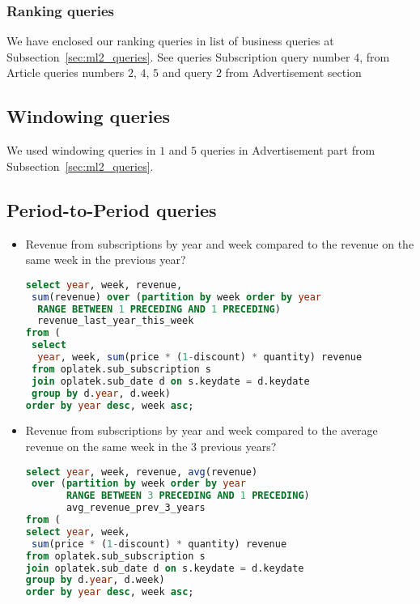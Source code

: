 \subsubsection{Ranking queries} %
\label{sub:ranking}
We have enclosed our ranking queries in list of business queries at Subsection~\ref{sec:ml2_queries}.
See queries Subscription query number $4$, from Article queries numbers $2$, $4$, $5$
and query $2$ from Advertisement section

\subsection{Windowing queries} 
\label{sub:windowing}
We used windowing queries in $1$ and $5$ queries in Advertisement part from Subsection~\ref{sec:ml2_queries}.

\subsection{Period-to-Period queries} %
\label{sub:period2period}
\begin{itemize}
    \item Revenue from subscriptions by year and week compared to the revenue on the same week in the previous year?
\begin{lstlisting}[language=sql] 
select year, week, revenue, 
 sum(revenue) over (partition by week order by year 
  RANGE BETWEEN 1 PRECEDING AND 1 PRECEDING) 
  revenue_last_year_this_week        
from (
 select 
  year, week, sum(price * (1-discount) * quantity) revenue 
 from oplatek.sub_subscription s 
 join oplatek.sub_date d on s.keydate = d.keydate 
 group by d.year, d.week)
order by year desc, week asc;
\end{lstlisting}

\item Revenue from subscriptions by year and week compared to the average revenue on the same week in the 3 previous years?
\begin{lstlisting}[language=sql] 
select year, week, revenue, avg(revenue) 
 over (partition by week order by year 
       RANGE BETWEEN 3 PRECEDING AND 1 PRECEDING) 
       avg_revenue_prev_3_years        
from (
select year, week, 
 sum(price * (1-discount) * quantity) revenue 
from oplatek.sub_subscription s 
join oplatek.sub_date d on s.keydate = d.keydate
group by d.year, d.week)
order by year desc, week asc;
\end{lstlisting}

\end{itemize}

